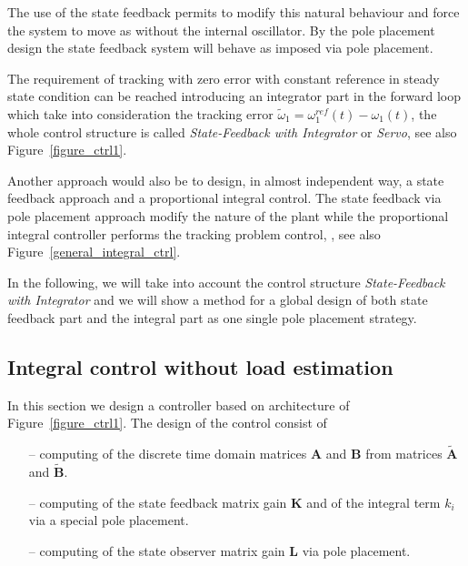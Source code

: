 \documentclass[11pt,a4paper,oneside]{book}
\numberwithin{equation}{section}
\theoremstyle{it}
\theoremstyle{definition}
\begin{document}
The use of the state feedback permits to modify this natural behaviour and force the system to move as without the internal oscillator. By the pole placement design the state feedback system will behave as imposed via pole placement. 

The requirement of tracking with zero error with constant reference in steady state condition can be reached introducing an integrator part in the forward loop which take into consideration the tracking error $\tilde{\omega}_1 = \omega_1^{ref}(t)-\omega_1(t)$, the whole control structure is called \textit{State-Feedback with Integrator} or \textit{Servo}, see also Figure~\ref{figure_ctrl1}.

Another approach would also be to design, in almost independent way, a state feedback approach and a proportional integral control. The state feedback via pole placement approach modify the nature of the plant while the proportional integral controller performs the tracking problem control, , see also Figure~\ref{general_integral_ctrl}.

In the following, we will take into account the control structure 
\textit{State-Feedback with Integrator} and we will show a method for a global 
design of both state feedback part and the integral part as one single pole 
placement strategy. 

\subsection{Integral control without load estimation} 
In this section we design a controller based on architecture of Figure~\ref{figure_ctrl1}. 
The design of the control consist of
\begin{itemize}
	\item[--] computing of the discrete time domain matrices $\mathbf{A}$ and $\mathbf{B}$ from matrices $\tilde{\mathbf{A}}$ and $\tilde{\mathbf{B}}$.
	\item[--] computing of the state feedback matrix gain $\mathbf{K}$ and of the integral term $k_i$ via a special pole placement.
	\item[--] computing of the state observer matrix gain $\mathbf{L}$ via pole placement.
\end{itemize}
\end{document}
